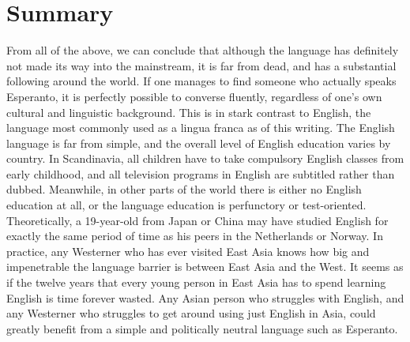 \section{Summary}
From all of the above, we can conclude that although the language has definitely not made its way into the mainstream, it is far from dead, and has a substantial following around the world.
If one manages to find someone who actually speaks Esperanto, it is perfectly possible to converse fluently, regardless of one's own cultural and linguistic background.
This is in stark contrast to English, the language most commonly used as a lingua franca as of this writing.
The English language is far from simple, and the overall level of English education varies by country.
In Scandinavia, all children have to take compulsory English classes from early childhood, and all television programs in English are subtitled rather than dubbed.
Meanwhile, in other parts of the world there is either no English education at all, or the language education is perfunctory or test-oriented.
Theoretically, a 19-year-old from Japan or China may have studied English for exactly the same period of time as his peers in the Netherlands or Norway.
In practice, any Westerner who has ever visited East Asia knows how big and impenetrable the language barrier is between East Asia and the West.
It seems as if the twelve years that every young person in East Asia has to spend learning English is time forever wasted.
Any Asian person who struggles with English, and any Westerner who struggles to get around using just English in Asia, could greatly benefit from a simple and politically neutral language such as Esperanto.

